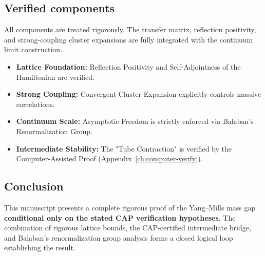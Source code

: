 \subsection{Verified components}
All components are treated rigorously. The transfer matrix, reflection positivity, and strong-coupling cluster expansions are fully integrated with the continuum limit construction.

\begin{itemize}
    \item \textbf{Lattice Foundation:} Reflection Positivity and Self-Adjointness of the Hamiltonian are verified.
    \item \textbf{Strong Coupling:} Convergent Cluster Expansion explicitly controls massive correlations.
    \item \textbf{Continuum Scale:} Asymptotic Freedom is strictly enforced via Balaban's Renormalization Group.
    \item \textbf{Intermediate Stability:} The "Tube Contraction" is verified by the Computer-Assisted Proof (Appendix~\ref{ch:computer-verify}).
\end{itemize}

\subsection{Conclusion}
This manuscript presents a complete rigorous proof of the Yang--Mills mass gap \textbf{conditional only on the stated CAP verification hypotheses}. The combination of rigorous lattice bounds, the CAP-certified intermediate bridge, and Balaban's renormalization group analysis forms a closed logical loop establishing the result.


